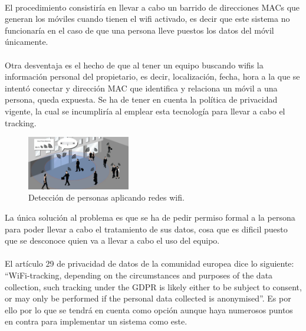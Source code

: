 \documentclass[paper=a4, fontsize=11pt,twoside]{scrartcl}	%
\begin{document}
            \paragraph{}
            El procedimiento consistiría en llevar a cabo un barrido de direcciones MACs que generan los móviles cuando tienen el wifi activado,
            es decir que este sistema no funcionaría en el caso de que una persona lleve puestos los datos del móvil únicamente.
            \paragraph{}
            Otra desventaja es el hecho de que al tener un equipo buscando wifis la información personal del propietario, es decir, localización,
            fecha, hora a la que se intentó conectar y dirección MAC que identifica y relaciona un móvil a una persona, queda expuesta.
            Se ha de tener en cuenta la política de privacidad vigente, la cual se incumpliría al emplear esta tecnología para llevar a cabo el tracking. 
            \begin{center}
                \begin{figure}[ht]
                    \centering
                    \includegraphics[width=0.4\textwidth]{WifiCounting.jpg}
                    \caption{Detección de personas aplicando redes wifi.}
                    \label{fig:mesh1}
                \end{figure}
            \end{center}
            La única solución al problema es que se ha de pedir permiso formal a la persona para poder llevar a cabo
            el tratamiento de sus datos, cosa que es dificil puesto que se desconoce quien va a llevar a cabo el uso del equipo.
            \paragraph{}
            El artículo 29 de privacidad de datos de la comunidad europea dice lo siguiente:
            “WiFi-tracking, depending on the circumstances and purposes of the data collection, such tracking under the GDPR is likely
            either to be subject to consent, or may only be performed if the personal data collected is anonymised”.
            Es por ello por lo que se tendrá en cuenta como opción aunque haya numerosos puntos en contra para implementar un sistema como este.
\end{document}
